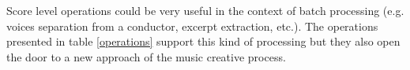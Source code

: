 \documentclass[twoside,10pt,a4paper]{article}
\begin{document}
Score level operations could be very useful in the context of batch processing (e.g. voices separation from a conductor, excerpt extraction, etc.). The operations presented in table \ref{operations} support this kind of processing but they also open the door to a new approach of the music creative process. 



\end{document}
